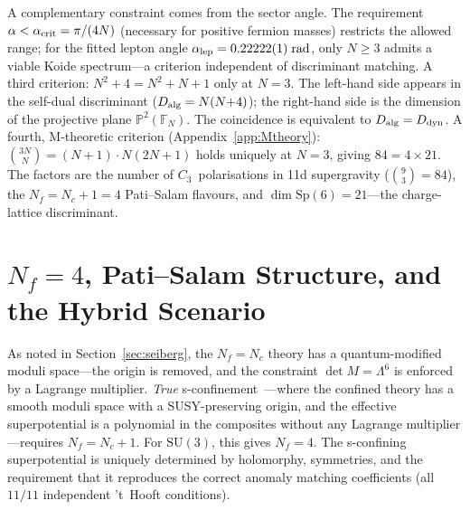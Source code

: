\documentclass[12pt,a4paper]{article}
\newcommand{\SU}{\mathrm{SU}}
\newcommand{\Nf}{N_f}
\newcommand{\Nc}{N_c}
\newcommand{\Sp}{\mathrm{Sp}}
\begin{document}
A complementary constraint comes from the sector angle.
The requirement $\alpha < \alpha_{\rm crit} = \pi/(4N)$
(necessary for positive fermion masses) restricts the allowed
range; for the fitted lepton angle $\alpha_{\rm lep} =
0.22222(1)\;\text{rad}$, only $N \geq 3$ admits a viable Koide
spectrum---a criterion independent of discriminant matching.
A third criterion:
$N^2 + 4 = N^2 + N + 1$ only at $N = 3$.
The left-hand side appears in the self-dual discriminant
($D_{\rm alg} = N(N{+}4)$); the right-hand side is
the dimension of the projective plane $\mathbb{P}^2(\mathbb{F}_N)$.
The coincidence is equivalent to $D_{\rm alg} = D_{\rm dyn}$.
A fourth, M-theoretic criterion (Appendix~\ref{app:Mtheory}):
$\binom{3N}{N} = (N{+}1)\cdot N(2N{+}1)$ holds uniquely at $N = 3$,
giving $84 = 4 \times 21$.  The factors are the number of
$C_3$~polarisations in 11d supergravity ($\binom{9}{3} = 84$),
the $\Nf = N_c{+}1 = 4$ Pati--Salam flavours, and
$\dim\Sp(6) = 21$---the charge-lattice discriminant.


\section{$\Nf = 4$, Pati--Salam Structure, and the Hybrid Scenario}
\label{sec:nf4}

As noted in Section~\ref{sec:seiberg}, the $\Nf = \Nc$ theory has a
quantum-modified moduli space---the origin is removed, and the
constraint $\det M = \Lambda^6$ is enforced by a Lagrange multiplier.
\emph{True} s-confinement~\cite{Intriligator:1995au,CsakiSchmaltzSkiba:1997}---where
the confined theory has a smooth moduli space with a
SUSY-preserving origin, and the effective superpotential is a
polynomial in the composites without any Lagrange
multiplier---requires $\Nf = \Nc + 1$.
For $\SU(3)$, this gives $\Nf = 4$.
The s-confining superpotential is uniquely determined by
holomorphy, symmetries, and the requirement that it reproduces
the correct anomaly matching coefficients (all $11/11$ independent
't~Hooft conditions).
\end{document}
